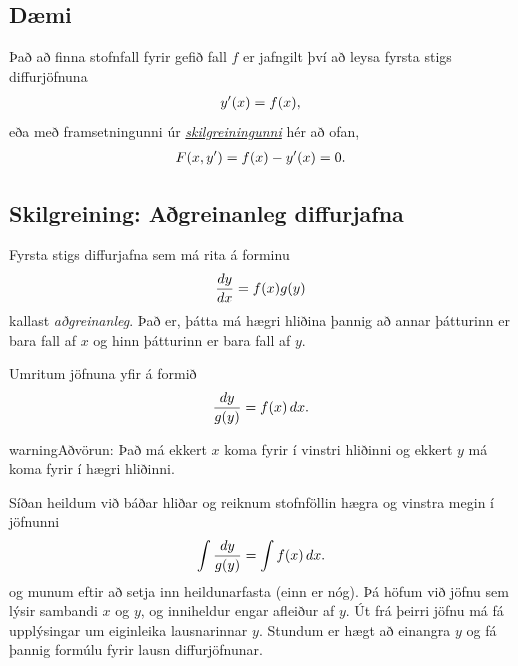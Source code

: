 \documentclass[b5paper,10pt,icelandic]{sphinxmanual}
\begin{document}
\subsection{Dæmi}
\label{kafli08:daemi}
Það að finna stofnfall fyrir gefið fall \(f\) er jafngilt því að leysa
fyrsta stigs diffurjöfnuna
\begin{gather}
\begin{split}y'(x) = f(x),\end{split}\notag
\end{gather}
eða með framsetningunni úr {\hyperref[kafli08:diffurjafna]{\emph{skilgreiningunni}}} hér
að ofan,
\begin{gather}
\begin{split}F(x,y') = f(x) - y'(x) = 0.\end{split}\notag
\end{gather}

\subsection{Skilgreining: Aðgreinanleg diffurjafna}
\label{kafli08:skilgreining-agreinanleg-diffurjafna}\label{kafli08:index-1}
Fyrsta stigs diffurjafna sem má rita á forminu
\begin{gather}
\begin{split}\frac{dy}{dx}=f(x)g(y)\end{split}\notag
\end{gather}
kallast \emph{aðgreinanleg}. Það er, þátta má hægri hliðina
þannig að annar þátturinn er bara fall af \(x\) og hinn þátturinn er
bara fall af \(y\).

Umritum jöfnuna yfir á formið
\begin{gather}
\begin{split}\frac{dy}{g(y)}=f(x)\,dx.\end{split}\notag
\end{gather}
\begin{notice}{warning}{Aðvörun:}
Það má ekkert \(x\) koma fyrir í vinstri hliðinni og
ekkert \(y\) má koma fyrir í hægri hliðinni.
\end{notice}

Síðan heildum við báðar hliðar og reiknum stofnföllin hægra og vinstra
megin í jöfnunni
\begin{gather}
\begin{split}\int\frac{dy}{g(y)}=\int f(x)\,dx.\end{split}\notag
\end{gather}
og munum eftir að setja inn heildunarfasta (einn er nóg). Þá höfum við
jöfnu sem lýsir sambandi \(x\) og \(y\), og inniheldur engar
afleiður af \(y\). Út frá þeirri jöfnu má fá upplýsingar um
eiginleika lausnarinnar \(y\). Stundum er hægt að einangra \(y\)
og fá þannig formúlu fyrir lausn diffurjöfnunar.
\end{document}
